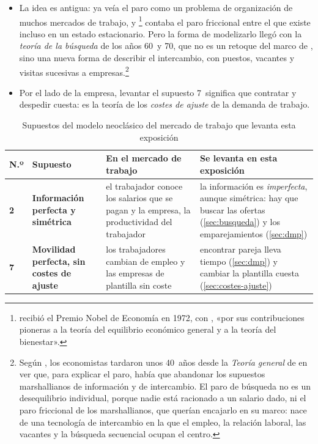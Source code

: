 \documentclass[11pt]{article}
\begin{document}
\begin{itemize}
\begin{itemize}
  \item La idea es antigua: \textcite{Beveridge1909Unemployment} ya veía el paro como un problema de organización de muchos mercados de trabajo, y \textcite{Hicks1932Theory}\footnote{ recibió el Premio Nobel de Economía en 1972, con , «por sus contribuciones pioneras a la teoría del equilibrio económico general y a la teoría del bienestar»\nocite{Nobel1972HicksArrow}.} contaba el paro friccional entre el que existe incluso en un estado estacionario. Pero la forma de modelizarlo llegó con la \emph{teoría de la búsqueda} de los años 60~y 70\nocite{Stigler1962Labor,McCall1970Economics,Phelps1970Microeconomic}, que no es un retoque del marco de , sino una nueva forma de describir el intercambio, con puestos, vacantes y visitas sucesivas a empresas.\footnote{Según \textcite[pp.~13-14]{DeVroey2016History}, los economistas tardaron unos 40~años desde la \emph{Teoría general} de  en ver que, para explicar el paro, había que abandonar los supuestos marshallianos de información y de intercambio. El paro de búsqueda no es un desequilibrio individual, porque nadie está racionado a un salario dado, ni el paro friccional de los marshallianos, que querían encajarlo en su marco: nace de una tecnología de intercambio en la que el empleo, la relación laboral, las vacantes y la búsqueda secuencial ocupan el centro.}
  \item Por el lado de la empresa, levantar el supuesto 7~significa que contratar y despedir cuesta: es la teoría de los \emph{costes de ajuste} de la demanda de trabajo\nocite{Oi1962Labor,Hamermesh1993Labor}.
  \end{itemize}

\begin{table}[H]
\centering
\caption{Supuestos del modelo neoclásico del mercado de trabajo que levanta esta exposición}\label{tab:supuestos-trabajo}
\small
\begin{tabular}{>{\centering\arraybackslash}m{0.6cm}>{\raggedright\arraybackslash}m{3.6cm}>{\raggedright\arraybackslash}m{4.6cm}>{\raggedright\arraybackslash}m{5.4cm}}
\toprule
\rowcolor{tceeazulpalido}\textbf{N.º} & \textbf{Supuesto} & \textbf{En el mercado de trabajo} & \textbf{Se levanta en esta exposición}\\
\midrule
\textcolor{tceemorado}{\textbf{2}} & \textbf{Información perfecta y simétrica} & el trabajador conoce los salarios que se pagan y la empresa, la productividad del trabajador & la información es \emph{imperfecta}, aunque simétrica: hay que buscar las ofertas (\ref{sec:busqueda}) y los emparejamientos (\ref{sec:dmp})\\
\addlinespace[0.3em]
\textcolor{tceemorado}{\textbf{7}} & \textbf{Movilidad perfecta, sin costes de ajuste} & los trabajadores cambian de empleo y las empresas de plantilla sin coste & encontrar pareja lleva tiempo (\ref{sec:dmp}) y cambiar la plantilla cuesta (\ref{sec:costes-ajuste})\\
\bottomrule
\end{tabular}
\end{table}


\end{itemize}
\end{document}
